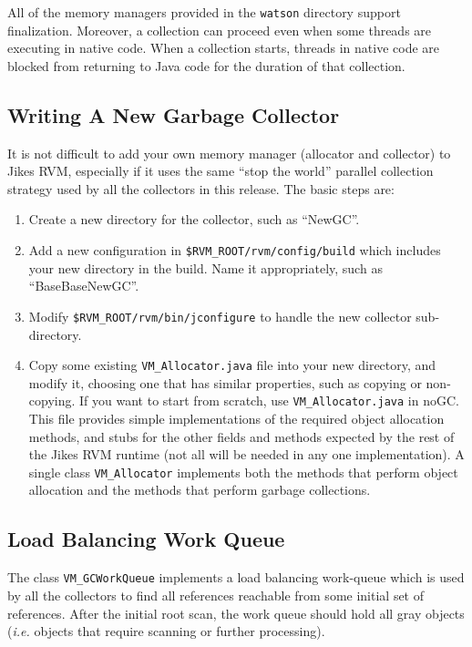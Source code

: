 All of the memory managers provided in the {\tt watson} directory
support finalization.  Moreover, a collection can proceed even 
when some threads are executing in native code. When a collection 
starts, threads in native code are blocked from returning to Java code
for the duration of that collection.

\subsection{Writing A New Garbage Collector} \label{sssec:newalloc}
It is not difficult to add your own memory manager (allocator and collector) to Jikes RVM,
especially if it uses the same ``stop the world'' parallel collection
strategy used by all the collectors in this release.  The basic steps
are:
\begin{enumerate}
\item Create a new directory for the collector, such as ``NewGC''.
\item Add a new configuration in {\tt \$RVM\_ROOT/rvm/config/build}
which includes your new directory in the build.  Name it appropriately, such as
``BaseBaseNewGC''.
\item Modify {\tt \$RVM\_ROOT/rvm/bin/jconfigure} to handle the new collector sub-directory.
\item Copy some existing {\tt VM\_Allocator.java} file into your new directory,
and modify it, choosing one that has similar properties, such as copying or
non-copying.  If you want to start from scratch, use {\tt VM\_Allocator.java} in noGC.
This file provides simple implementations of the required object allocation
methods, and stubs for the other fields and methods expected by the rest
of the Jikes RVM runtime (not all will be needed in any one implementation).
A single class {\tt VM\_Allocator} implements both
the methods that perform object allocation and the methods that perform
garbage collections.
\end{enumerate}

\subsection{Load Balancing Work Queue} \label{sssec:workqueue}
The class {\tt VM\_GCWorkQueue} implements a load balancing work-queue
which is used by all the collectors to find all references reachable from
some initial set of references.  After the initial root scan, the work queue
should hold all gray objects ({\it i.e.} objects that require scanning or further
processing).

